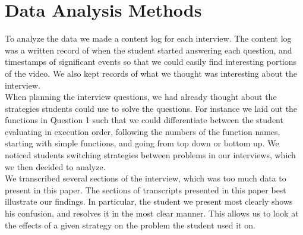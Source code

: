 \section{Data Analysis Methods}

To analyze the data we made a content log for each interview.
The content log was a written record of when the student started answering each question,
 and timestamps of significant events so that we could easily find interesting portions of the video.
We also kept records of what we thought was interesting about the interview. \\

When planning the interview questions, we had already thought about the strategies students could use to solve the questions.
For instance we laid out the functions in Question 1 such that we could differentiate between the student evaluating in execution order, following the numbers of the function names, starting with simple functions, and going from top down or bottom up.
We noticed students switching strategies between problems in our interviews, which we then decided to analyze. \\

We transcribed several sections of the interview, which was too much data to present in this paper.
The sections of transcripts presented in this paper best illustrate our findings.
In particular, the student we present most clearly shows his confusion, and resolves it in the most clear manner.
This allows us to look at the effects of a given strategy on the problem the student used it on.

\newpage
